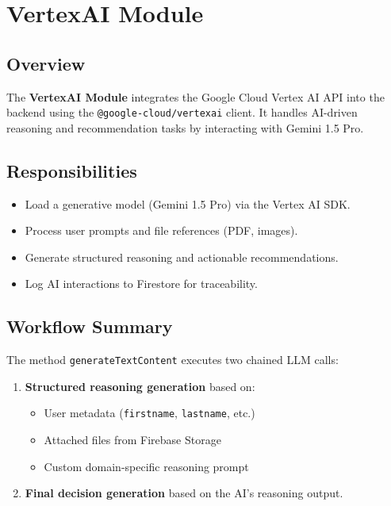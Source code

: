 \section{VertexAI Module}

\subsection*{Overview}

The \textbf{VertexAI Module} integrates the Google Cloud Vertex AI API into the backend using the \texttt{@google-cloud/vertexai} client. It handles AI-driven reasoning and recommendation tasks by interacting with Gemini 1.5 Pro.

\subsection*{Responsibilities}

\begin{itemize}
    \item Load a generative model (Gemini 1.5 Pro) via the Vertex AI SDK.
    \item Process user prompts and file references (PDF, images).
    \item Generate structured reasoning and actionable recommendations.
    \item Log AI interactions to Firestore for traceability.
\end{itemize}

\subsection*{Workflow Summary}

The method \texttt{generateTextContent} executes two chained LLM calls:

\begin{enumerate}
    \item \textbf{Structured reasoning generation} based on:
    \begin{itemize}
        \item User metadata (\texttt{firstname}, \texttt{lastname}, etc.)
        \item Attached files from Firebase Storage
        \item Custom domain-specific reasoning prompt
    \end{itemize}
    \item \textbf{Final decision generation} based on the AI's reasoning output.
\end{enumerate}

